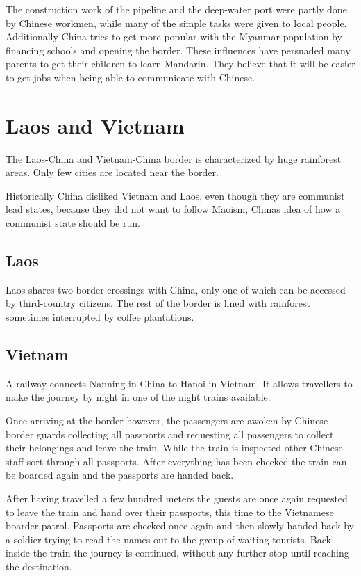 \documentclass[conference]{IEEEtran}
\begin{document}
	The construction work of the pipeline and the deep-water port were partly done by Chinese workmen, while many of the simple tasks were given to local people. Additionally China tries to get more popular with the Myanmar population by financing schools and opening the border. These influences have persuaded many parents to get their children to learn Mandarin. They believe that it will be easier to get jobs when being able to communicate with Chinese.
	
	\section{Laos and Vietnam}
	The Laos-China and Vietnam-China border is characterized by huge rainforest areas. Only few cities are located near the border.
	
	Historically China disliked Vietnam and Laos, even though they are communist lead states, because they did not want to follow Maoism, Chinas idea of how a communist state should be run.
	
	\subsection{Laos}
	Laos shares two border crossings with China, only one of which can be accessed by third-country citizens. The rest of the border is lined with rainforest sometimes interrupted by coffee plantations.
	
	\subsection{Vietnam}
	A railway connects Nanning in China to Hanoi in Vietnam. It allows travellers to make the journey by night in one of the night trains available.
	
	Once arriving at the border however, the passengers are awoken by Chinese border guards collecting all passports and requesting all passengers to collect their belongings and leave the train. While the train is inspected other Chinese staff sort through all passports. After everything has been checked the train can be boarded again and the passports are handed back.
	
	After having travelled a few hundred meters the guests are once again requested to leave the train and hand over their passports, this time to the Vietnamese boarder patrol. Passports are checked once again and then slowly handed back by a soldier trying to read the names out to the group of waiting tourists. Back inside the train the journey is continued, without any further stop until reaching the destination.
	
\end{document}
